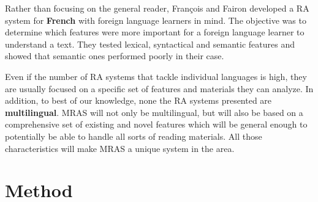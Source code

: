 \documentclass{bsu-ms}
\begin{document}

Rather than focusing on the general reader,  Fran{\c{c}}ois and Fairon \cite{franccois2012ai} developed a RA system for \textbf{French} with foreign language learners in mind. The objective was to determine which features were more important for a foreign language learner to understand a text. They tested lexical, syntactical and semantic features and showed that semantic ones performed poorly in their case.




Even if the number of RA systems that tackle individual languages is high, they are usually focused on a specific set of features and materials they can analyze. In addition, to best of our knowledge, none the RA systems presented are \textbf{multilingual}. MRAS will not only be multilingual, but will also be based on a comprehensive set of existing and novel features which will be general enough to potentially be able to handle all sorts of reading materials. All those characteristics will make MRAS a unique system in the area.






\chapter{Method}
\end{document}
